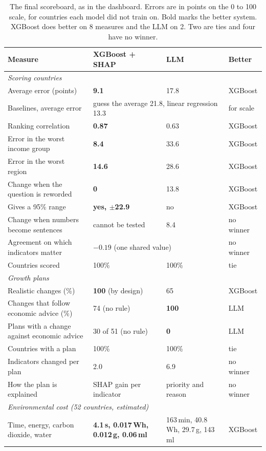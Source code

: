 \documentclass{article}
\begin{document}
\begin{table}[t]
\centering
\footnotesize
\setlength{\tabcolsep}{4pt}
\begin{tabular}{p{4.9cm}p{3.3cm}p{3.0cm}l}
\toprule
Measure & XGBoost + SHAP & LLM & Better \\
\midrule
\multicolumn{4}{l}{\emph{Scoring countries}} \\
Average error (points) & \textbf{9.1} & 17.8 & XGBoost \\
Baselines, average error & \multicolumn{2}{l}{guess the average 21.8, linear regression 13.3} & for scale \\
Ranking correlation & \textbf{0.87} & 0.63 & XGBoost \\
Error in the worst income group & \textbf{8.4} & 33.6 & XGBoost \\
Error in the worst region & \textbf{14.6} & 28.6 & XGBoost \\
Change when the question is reworded & \textbf{0} & 13.8 & XGBoost \\
Gives a 95\% range & \textbf{yes, $\pm$22.9} & no & XGBoost \\
Change when numbers become sentences & cannot be tested & 8.4 & no winner \\
Agreement on which indicators matter & \multicolumn{2}{l}{$-0.19$ (one shared value)} & no winner \\
Countries scored & 100\% & 100\% & tie \\
\midrule
\multicolumn{4}{l}{\emph{Growth plans}} \\
Realistic changes (\%) & \textbf{100} (by design) & 65 & XGBoost \\
Changes that follow economic advice (\%) & 74 (no rule) & \textbf{100} & LLM \\
Plans with a change against economic advice & 30 of 51 (no rule) & \textbf{0} & LLM \\
Countries with a plan & 100\% & 100\% & tie \\
Indicators changed per plan & 2.0 & 6.9 & no winner \\
How the plan is explained & SHAP gain per indicator & priority and reason & no winner \\
\midrule
\multicolumn{4}{l}{\emph{Environmental cost (52 countries, estimated)}} \\
Time, energy, carbon dioxide, water & \textbf{4.1\,s, 0.017\,Wh, 0.012\,g, 0.06\,ml} & 163\,min, 40.8\,Wh, 29.7\,g, 143\,ml & XGBoost \\
\bottomrule
\end{tabular}
\caption{The final scoreboard, as in the dashboard. Errors are in points on the 0 to 100 scale, for countries each model did not train on. Bold marks the better system. XGBoost does better on 8 measures and the LLM on 2. Two are ties and four have no winner.}
\label{tab:scoreboard}
\end{table}
\end{document}
